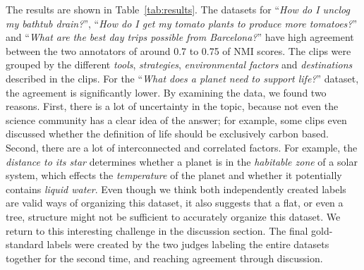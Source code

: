 The results are shown in Table~\ref{tab:results}. The datasets
for ``\emph{How do I unclog my bathtub drain?}'', ``\emph{How do I get my
	tomato plants to produce more tomatoes?}'' and ``\emph{What are the best day trips possible from Barcelona?}'' have high agreement between the
two annotators of around 0.7 to 0.75 of NMI scores.  The clips were grouped by the different \emph{tools},
\emph{strategies}, \emph{environmental factors} and \emph{destinations} described in the clips. For
the ``\emph{What does a planet need to support life?}'' dataset, the agreement
is significantly lower. By examining the data, we found two reasons.  First,
there is a lot of uncertainty in the topic, because not even the science
community has a clear idea of the answer; for example, some clips even discussed whether
the definition of life should be exclusively carbon based. Second, there are a
lot of interconnected and correlated factors. For example, the \emph{distance
	to its star} determines whether a planet is in the \emph{habitable zone} of
a solar system, which effects the \emph{temperature} of the planet and whether
it potentially contains \emph{liquid water}. Even though we think both
independently created labels are valid ways of organizing this dataset, it also
suggests that a flat, or even a tree, structure might not be sufficient to
accurately organize this dataset. We return to this interesting challenge in
the discussion section. The final gold-standard labels were created by the two
judges labeling the entire datasets together for the second time, and reaching
agreement through discussion.


